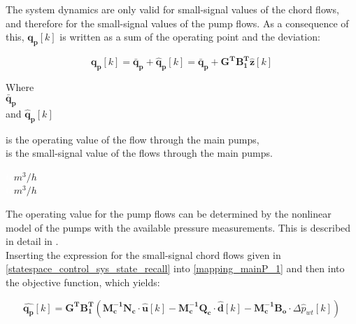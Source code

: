 The system dynamics are only valid for small-signal values of the chord flows, and therefore for the small-signal values of the pump flows. As a consequence of this, $\bm{q_p}[k]$ is written as a sum of the operating point and the deviation:  

\begin{equation}
\bm{q_p}[k]  = \bm{\bar{q}_p} + \bm{\hat{q}_p}[k] = \bm{\bar{q}_p} + \bm{G^T} \bm{B_{1}^T}  \bm{\hat{z}}[k]
\label{mapping_mainP_1}
\end{equation}

\begin{minipage}[t]{0.20\textwidth}
Where\\
\hspace*{8mm} $ \bm{\bar{q}_p} $ \\
and \hspace*{0.7mm} $ \bm{\hat{q}_p}[k] $ 
\end{minipage}
\begin{minipage}[t]{0.68\textwidth}
\vspace*{2mm}
is the operating value of the flow through the main pumps, \\
is the small-signal value of the flows through the main pumps. 
\end{minipage}
\begin{minipage}[t]{0.10\textwidth}
\vspace*{1.8mm}
\textcolor{White}{te}$\unit{m^3/h}$\\
\textcolor{White}{te}$\unit{m^3/h}$
\end{minipage}

The operating value for the pump flows can be determined by the nonlinear model of the pumps with the available pressure measurements. This is described in detail in . 
\\
Inserting the expression for the small-signal chord flows given in \eqref{statespace_control_sys_state_recall} into \eqref{mapping_mainP_1} and then into the objective function, which yields:


 \begin{equation}
 \bm{\hat{q_{p}}}[k] =   \bm{G^T} \bm{B_{1}^T}(\bm{M_c^{-1}}\bm{N_c} \cdot \bm{\hat{u}}[k] -\bm{M_c^{-1}}\bm{Q_c} \cdot \bm{\hat{d}}[k] -\bm{M_c^{-1}}\bm{B_{o}} \cdot \Delta \hat{p}_{wt}[k])   
 \label{mappingandstates}
\end{equation}

